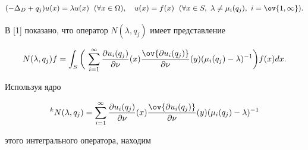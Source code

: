 $$


(-\Delta_D+q_j)u(x)=\lambda u(x) \ \; (\forall x\in\Omega),\quad


u(x)=f(x) \ \; (\forall x\in S,\ \lambda\ne\mu_i(q_j), 


\ i=\ov{1,\infty}). 


$$


 


В [1] показано, что оператор $N(\lambda,q_j)$ имеет представление 


$$ 


N(\lambda,q_j)f=\int_S\bigg(\,\sum^\infty_{i=1} 


\frac{\partial u_i(q_j)}{\partial\nu}(x) 


\frac{\ov{\partial u_i(q_j)}}{\partial\nu}(y) 


(\mu_i(q_j)-\lambda)^{-1}\bigg)f(x)dx. 


$$ 


Используя ядро 


$$ 


^k N(\lambda,q_j)=\sum^\infty_{i=1} 


\frac{\partial u_i(q_j)}{\partial\nu}(x) 


\frac{\ov{\partial u_i(q_j)}}{\partial\nu}(y) 


(\mu_i(q_j)-\lambda)^{-1} 


$$ 


этого интегрального оператора, находим 


